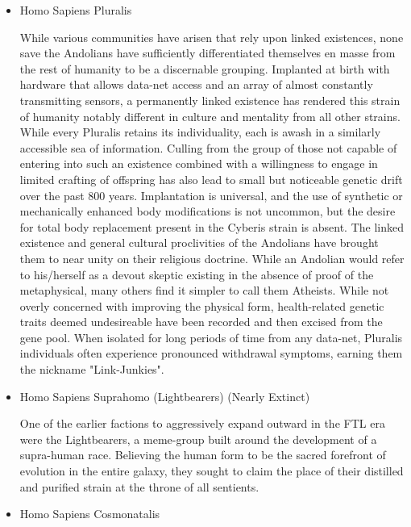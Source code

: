 \begin{itemize}
\item Homo Sapiens Pluralis

While various communities have arisen that rely upon linked
existences, none save the Andolians have sufficiently differentiated
themselves en masse from the rest of humanity to be a discernable
grouping. Implanted at birth with hardware that allows data-net access
and an array of almost constantly transmitting sensors, a permanently
linked existence has rendered this strain of humanity notably
different in culture and mentality from all other strains.  While
every Pluralis retains its individuality, each is awash in a similarly
accessible sea of information. Culling from the group of those not
capable of entering into such an existence combined with a willingness
to engage in limited crafting of offspring has also lead to small but
noticeable genetic drift over the past 800 years. Implantation is
universal, and the use of synthetic or mechanically enhanced body
modifications is not uncommon, but the desire for total body
replacement present in the Cyberis strain is absent.  The linked
existence and general cultural proclivities of the Andolians have
brought them to near unity on their religious doctrine. While an
Andolian would refer to his/herself as a devout skeptic existing in
the absence of proof of the metaphysical, many others find it simpler
to call them Atheists.  While not overly concerned with improving the
physical form, health-related genetic traits deemed undesireable have
been recorded and then excised from the gene pool. When isolated for
long periods of time from any data-net, Pluralis individuals often
experience pronounced withdrawal symptoms, earning them the nickname
"Link-Junkies".

\item Homo Sapiens Suprahomo (Lightbearers) 
(Nearly Extinct) 

One of the earlier factions to aggressively expand outward in the FTL
era were the Lightbearers, a meme-group built around the development
of a supra-human race. Believing the human form to be the sacred
forefront of evolution in the entire galaxy, they sought to claim the
place of their distilled and purified strain at the throne of all
sentients.

\item Homo Sapiens Cosmonatalis


\end{itemize}
